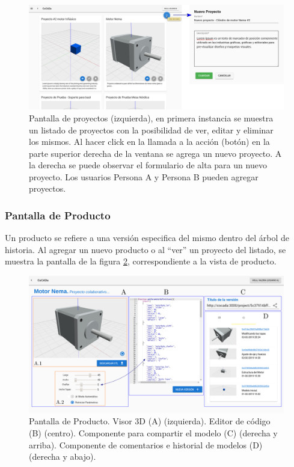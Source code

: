 \begin{figure}[h]
    \includegraphics[width=16cm]{Img/Desarrollo/cocada0.jpg}
    \centering
    \caption{\footnotesize{Pantalla de proyectos (izquierda), en primera instancia se muestra un listado de proyectos con la posibilidad de ver, editar y eliminar los mismos. Al hacer click en la llamada a la acción (botón) en la parte superior derecha de la ventana se agrega un nuevo proyecto. A la derecha se puede observar el formulario de alta para un nuevo proyecto. Los usuarios Persona A y Persona B pueden agregar proyectos.}}
     \label{fig:cocada1}
\end{figure}

\subsubsection{Pantalla de Producto}
Un producto se refiere a una versión especifica del mismo dentro del árbol de historia. 
Al agregar un nuevo producto o al ``ver'' un proyecto del listado, se muestra la pantalla de la figura \ref{fig:cocada2}, correspondiente a la vista de producto. 

\begin{figure}[ht]
    \includegraphics[width=16cm]{Img/Desarrollo/cocada-pantalla.png}
    \centering
    \caption{\footnotesize{Pantalla de Producto. Visor 3D (A) (izquierda). Editor de código (B) (centro). Componente para compartir el modelo (C) (derecha y arriba). Componente de comentarios e historial de modelos (D) (derecha y abajo).}}
     \label{fig:cocada2}
\end{figure}

